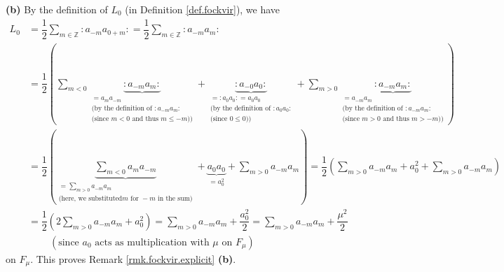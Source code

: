 \documentclass
[numbers=enddot,12pt,final,onecolumn,german,notitlepage]{scrartcl}%
\theoremstyle{definition}
\begin{document}
\textbf{(b)} By the definition of $L_{0}$ (in Definition \ref{def.fockvir}),
we have%
\begin{align*}
L_{0}  &  =\dfrac{1}{2}\sum\limits_{m\in\mathbb{Z}}\left.  :a_{-m}%
a_{0+m}:\right.  =\dfrac{1}{2}\sum\limits_{m\in\mathbb{Z}}\left.  :a_{-m}%
a_{m}:\right. \\
&  =\dfrac{1}{2}\left(  \sum\limits_{m<0}\underbrace{\left.  :a_{-m}%
a_{m}:\right.  }_{\substack{=a_{m}a_{-m}\\\text{(by the definition of }\left.
:a_{-m}a_{m}:\right.  \\\text{(since }m<0\text{ and thus }m\leq-m\text{))}%
}}+\underbrace{\left.  :a_{-0}a_{0}:\right.  }_{\substack{=\left.  :a_{0}%
a_{0}:\right.  =a_{0}a_{0}\\\text{(by the definition of }\left.  :a_{0}%
a_{0}:\right.  \\\text{(since }0\leq0\text{))}}}+\sum\limits_{m>0}%
\underbrace{\left.  :a_{-m}a_{m}:\right.  }_{\substack{=a_{-m}a_{m}\\\text{(by
the definition of }\left.  :a_{-m}a_{m}:\right.  \\\text{(since }m>0\text{ and
thus }m>-m\text{))}}}\right) \\
&  =\dfrac{1}{2}\left(  \underbrace{\sum\limits_{m<0}a_{m}a_{-m}%
}_{\substack{=\sum\limits_{m>0}a_{-m}a_{m}\\\text{(here, we substituted
}m\text{ for }-m\text{ in the sum)}}}+\underbrace{a_{0}a_{0}}_{=a_{0}^{2}%
}+\sum\limits_{m>0}a_{-m}a_{m}\right)  =\dfrac{1}{2}\left(  \sum
\limits_{m>0}a_{-m}a_{m}+a_{0}^{2}+\sum\limits_{m>0}a_{-m}a_{m}\right) \\
&  =\dfrac{1}{2}\left(  2\sum\limits_{m>0}a_{-m}a_{m}+a_{0}^{2}\right)
=\sum\limits_{m>0}a_{-m}a_{m}+\dfrac{a_{0}^{2}}{2}=\sum\limits_{m>0}%
a_{-m}a_{m}+\dfrac{\mu^{2}}{2}\\
&  \ \ \ \ \ \ \ \ \ \ \left(  \text{since }a_{0}\text{ acts as multiplication
with }\mu\text{ on }F_{\mu}\right)
\end{align*}
on $F_{\mu}$. This proves Remark \ref{rmk.fockvir.explicit} \textbf{(b)}.
\end{document}
